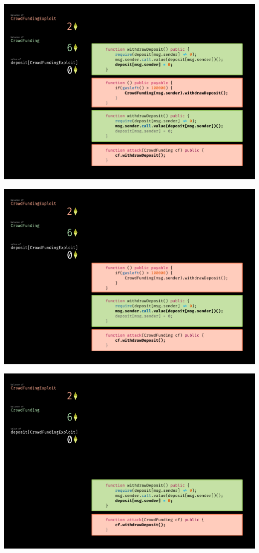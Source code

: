 \documentclass[xcolor=x11names,compress]{beamer}
\begin{document}
\begin{frame}[fragile]
\begin{overprint}
\begin{center}
		\end{center}
		\begin{center}
			\includegraphics[width=\textwidth,height=0.8\textheight,keepaspectratio]{img/reentrancy/12.pdf}
		\end{center}
		\begin{center}
			\includegraphics[width=\textwidth,height=0.8\textheight,keepaspectratio]{img/reentrancy/13.pdf}
		\end{center}
		\begin{center}
			\includegraphics[width=\textwidth,height=0.8\textheight,keepaspectratio]{img/reentrancy/14.pdf}

\end{center}
\end{overprint}
\end{frame}
\end{document}
